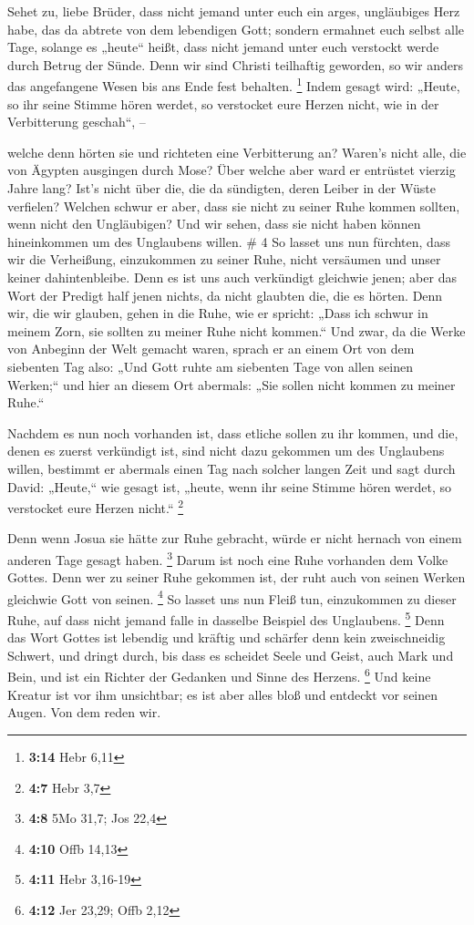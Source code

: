  Sehet zu, liebe Brüder, dass nicht jemand unter euch ein
arges, ungläubiges Herz habe, das da abtrete von dem lebendigen Gott;
 sondern ermahnet euch selbst alle Tage, solange es
„heute`` heißt, dass nicht jemand unter euch verstockt werde durch
Betrug der Sünde.  Denn wir sind Christi teilhaftig
geworden, so wir anders das angefangene Wesen bis ans Ende fest
behalten. \footnote{\textbf{3:14} Hebr 6,11}  Indem gesagt
wird: „Heute, so ihr seine Stimme hören werdet, so verstocket eure
Herzen nicht, wie in der Verbitterung geschah``, --

 welche denn hörten sie und richteten eine Verbitterung an?
Waren's nicht alle, die von Ägypten ausgingen durch Mose? 
Über welche aber ward er entrüstet vierzig Jahre lang? Ist's nicht über
die, die da sündigten, deren Leiber in der Wüste verfielen?
 Welchen schwur er aber, dass sie nicht zu seiner Ruhe
kommen sollten, wenn nicht den Ungläubigen?  Und wir sehen,
dass sie nicht haben können hineinkommen um des Unglaubens willen. \# 4
 So lasset uns nun fürchten, dass wir die Verheißung,
einzukommen zu seiner Ruhe, nicht versäumen und unser keiner
dahintenbleibe.  Denn es ist uns auch verkündigt gleichwie
jenen; aber das Wort der Predigt half jenen nichts, da nicht glaubten
die, die es hörten.  Denn wir, die wir glauben, gehen in die
Ruhe, wie er spricht: „Dass ich schwur in meinem Zorn, sie sollten zu
meiner Ruhe nicht kommen.`` Und zwar, da die Werke von Anbeginn der Welt
gemacht waren,  sprach er an einem Ort von dem siebenten Tag
also: „Und Gott ruhte am siebenten Tage von allen seinen Werken;``
 und hier an diesem Ort abermals: „Sie sollen nicht kommen
zu meiner Ruhe.``

 Nachdem es nun noch vorhanden ist, dass etliche sollen zu
ihr kommen, und die, denen es zuerst verkündigt ist, sind nicht dazu
gekommen um des Unglaubens willen,  bestimmt er abermals
einen Tag nach solcher langen Zeit und sagt durch David: „Heute,`` wie
gesagt ist, „heute, wenn ihr seine Stimme hören werdet, so verstocket
eure Herzen nicht.`` \footnote{\textbf{4:7} Hebr 3,7}

 Denn wenn Josua sie hätte zur Ruhe gebracht, würde er nicht
hernach von einem anderen Tage gesagt haben. \footnote{\textbf{4:8} 5Mo
  31,7; Jos 22,4}  Darum ist noch eine Ruhe vorhanden dem
Volke Gottes.  Denn wer zu seiner Ruhe gekommen ist, der
ruht auch von seinen Werken gleichwie Gott von seinen. \footnote{\textbf{4:10}
  Offb 14,13}  So lasset uns nun Fleiß tun, einzukommen zu
dieser Ruhe, auf dass nicht jemand falle in dasselbe Beispiel des
Unglaubens. \footnote{\textbf{4:11} Hebr 3,16-19}  Denn das
Wort Gottes ist lebendig und kräftig und schärfer denn kein
zweischneidig Schwert, und dringt durch, bis dass es scheidet Seele und
Geist, auch Mark und Bein, und ist ein Richter der Gedanken und Sinne
des Herzens. \footnote{\textbf{4:12} Jer 23,29; Offb 2,12} 
Und keine Kreatur ist vor ihm unsichtbar; es ist aber alles bloß und
entdeckt vor seinen Augen. Von dem reden wir.

